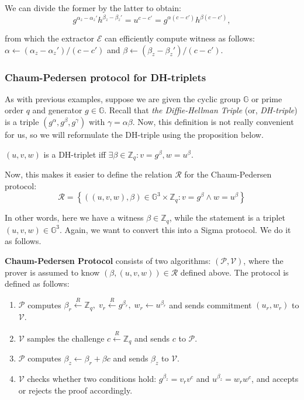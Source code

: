 \documentclass[../lecture-notes.tex]{subfiles}
\begin{document}
We can divide the former by the latter to obtain:
\begin{equation*}
    g^{\alpha_z - \alpha_z'}h^{\beta_z - \beta_z'} = u^{c-c'} = g^{\alpha(c-c')}h^{\beta(c-c')},
\end{equation*}

from which the extractor $\mathcal{E}$ can efficiently compute witness as follows: $\alpha \gets (\alpha_z - \alpha_z')\big/(c-c')$ and $\beta \gets (\beta_z - \beta_z')\big/(c-c')$.

\subsubsection{Chaum-Pedersen protocol for DH-triplets}

As with previous examples, suppose we are given the cyclic group $\mathbb{G}$ or prime order $q$ and generator $g \in \mathbb{G}$. Recall that \textit{the Diffie-Hellman Triple} (or, \textit{DH-triple}) is a triple $(g^{\alpha},g^{\beta},g^{\gamma})$ with $\gamma=\alpha\beta$. Now, this definition is not really convenient for us, so we will reformulate the DH-triple using the proposition below.

\begin{proposition}
    $(u,v,w)$ is a DH-triplet iff $\exists \beta \in \mathbb{Z}_q: v = g^{\beta}, w = u^{\beta}$.
\end{proposition}

Now, this makes it easier to define the relation $\mathcal{R}$ for the Chaum-Pedersen protocol:
\begin{equation*}
    \mathcal{R} = \left\{ ((u,v,w), \beta) \in \mathbb{G}^3 \times \mathbb{Z}_q: v = g^{\beta} \wedge w = u^{\beta} \right\}
\end{equation*}

In other words, here we have a witness $\beta \in \mathbb{Z}_q$, while the statement is a triplet $(u,v,w) \in \mathbb{G}^3$. Again, we want to convert this into a Sigma protocol. We do it as follows.

\begin{definition}
    \textbf{Chaum-Pedersen Protocol} consists of two algorithms: $(\mathcal{P}, \mathcal{V})$, where the prover is assumed to know $(\beta,(u,v,w)) \in \mathcal{R}$ defined above. The protocol is defined as follows:
    \begin{enumerate}
        \item $\mathcal{P}$ computes $\beta_r \xleftarrow{R} \mathbb{Z}_q, \; v_r \xleftarrow{R} g^{\beta_r}, \; w_r \gets u^{\beta_r}$ and sends commitment $(u_r,w_r)$ to $\mathcal{V}$.
        \item $\mathcal{V}$ samples the challenge $c \xleftarrow{R} \mathbb{Z}_q$ and sends $c$ to $\mathcal{P}$.
        \item $\mathcal{P}$ computes $\beta_z \gets \beta_r + \beta c$ and sends $\beta_z$ to $\mathcal{V}$.
        \item $\mathcal{V}$ checks whether two conditions hold: $g^{\beta_z} = v_rv^c$ and $u^{\beta_z} = w_r w^c$, and accepts or rejects the proof accordingly.
    \end{enumerate}
\end{definition}
\end{document}
